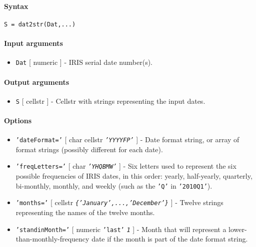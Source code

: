 


	\paragraph{Syntax}\label{syntax}

\begin{verbatim}
S = dat2str(Dat,...)
\end{verbatim}

\paragraph{Input arguments}\label{input-arguments}

\begin{itemize}
\itemsep1pt\parskip0pt
\item
  \texttt{Dat} {[} numeric {]} - IRIS serial date number(s).
\end{itemize}

\paragraph{Output arguments}\label{output-arguments}

\begin{itemize}
\itemsep1pt\parskip0pt
\item
  \texttt{S} {[} cellstr {]} - Cellstr with strings representing the
  input dates.
\end{itemize}

\paragraph{Options}\label{options}

\begin{itemize}
\item
  \texttt{'dateFormat='} {[} char \textbar{} cellstr \textbar{}
  \emph{\texttt{'YYYYFP'}} {]} - Date format string, or array of format
  strings (possibly different for each date).
\item
  \texttt{'freqLetters='} {[} char \textbar{} \emph{\texttt{'YHQBMW'}}
  {]} - Six letters used to represent the six possible frequencies of
  IRIS dates, in this order: yearly, half-yearly, quarterly, bi-monthly,
  monthly, and weekly (such as the \texttt{'Q'} in \texttt{'2010Q1'}).
\item
  \texttt{'months='} {[} cellstr \textbar{}
  \emph{\texttt{\{'January',...,'December'\}}} {]} - Twelve strings
  representing the names of the twelve months.
\item
  \texttt{'standinMonth='} {[} numeric \textbar{} \texttt{'last'}
  \textbar{} \emph{\texttt{1}} {]} - Month that will represent a
  lower-than-monthly-frequency date if the month is part of the date
  format string.
\end{itemize}

